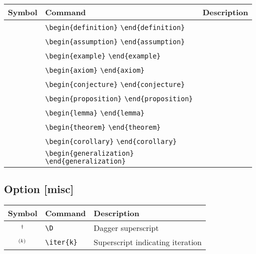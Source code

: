 \documentclass{article}
\begin{document}
\begin{tabular}{cll}
  \toprule
  Symbol & Command & Description \\
  \midrule
  & \verb|\begin{definition}| \verb|\end{definition}| & \\
  & \verb|\begin{assumption}| \verb|\end{assumption}| & \\
  & \verb|\begin{example}| \verb|\end{example}| & \\
  \midrule
  & \verb|\begin{axiom}| \verb|\end{axiom}| & \\
  & \verb|\begin{conjecture}| \verb|\end{conjecture}| & \\
  & \verb|\begin{proposition}| \verb|\end{proposition}| & \\
  & \verb|\begin{lemma}| \verb|\end{lemma}| & \\
  & \verb|\begin{theorem}| \verb|\end{theorem}| & \\
  & \verb|\begin{corollary}| \verb|\end{corollary}| & \\
  & \verb|\begin{generalization}| \verb|\end{generalization}| & \\
  \bottomrule
\end{tabular}

\subsection*{Option [misc]}

\begin{tabular}{cll}
  \toprule
  Symbol & Command & Description \\
  \midrule
  $^{\dag}$ & \verb|\D| & Dagger superscript \\
  $^{(k)}$ & \verb|\iter{k}| & Superscript indicating iteration \\
  \bottomrule
\end{tabular}
\end{document}
